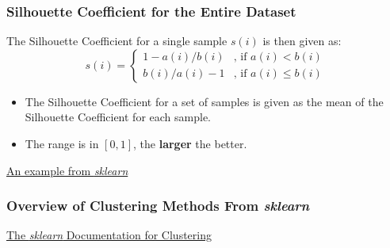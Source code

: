 \documentclass[aspectratio=169, 10pt]{beamer}
\begin{document}
\begin{frame}
    \frametitle{Silhouette Coefficient for the Entire Dataset}
    
    The Silhouette Coefficient for a single sample $s(i)$ is then given as:
    \begin{equation*}
        s(i) = 
        \begin{cases}
            1 - a(i) / b(i) & \text{, if }a(i) < b(i)\\
            b(i) / a(i) - 1 & \text{, if }a(i) \leq b(i)
        \end{cases}
    \end{equation*}

    \begin{itemize}
        \item The Silhouette Coefficient for a set of samples is given as the mean of the Silhouette Coefficient for each sample.
        \item The range is in $[0, 1]$, the \textbf{larger} the better.
    \end{itemize}
    
    \begin{example}
        \href{https://scikit-learn.org/stable/auto_examples/cluster/plot_kmeans_silhouette_analysis.html}{An example from \textit{sklearn}}
    \end{example}
\end{frame}

\begin{frame}
    \frametitle{Overview of Clustering Methods From \textit{sklearn}}
    
    \begin{example}
        \href{https://scikit-learn.org/stable/modules/clustering.html}{The \textit{sklearn} Documentation for Clustering}
    \end{example}
    
\end{frame}
\end{document}
